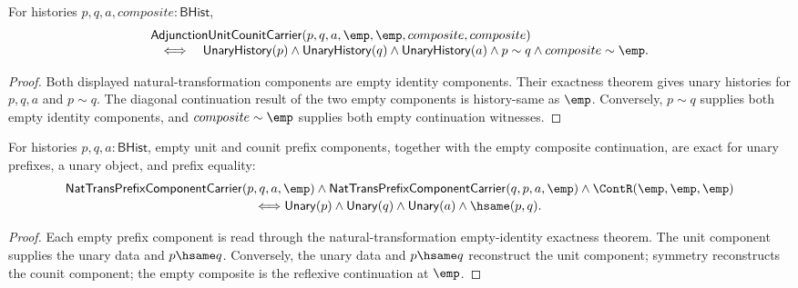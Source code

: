 \begin{theorem}
\label{thm:adjunction-unit-counit-empty-components-exact}
For histories $p,q,a,composite:\mathsf{BHist}$,
$$
\begin{array}{l}
\mathsf{AdjunctionUnitCounitCarrier}(p,q,a,\emp,\emp,composite,composite)\\
\quad\Longleftrightarrow\quad
\mathsf{UnaryHistory}(p)\land
\mathsf{UnaryHistory}(q)\land
\mathsf{UnaryHistory}(a)\land
p\sim q\land composite\sim\emp.
\end{array}
$$
\end{theorem}
\begin{proof}
Both displayed natural-transformation components are empty identity components.
Their exactness theorem gives unary histories for $p,q,a$ and $p\sim q$. The
diagonal continuation result of the two empty components is history-same as
$\emp$. Conversely, $p\sim q$ supplies both empty identity components, and
$composite\sim\emp$ supplies both empty continuation witnesses.
\end{proof}

\begin{theorem}
\label{thm:adjunction-empty-unit-counit-prefix}
For histories $p,q,a:\mathsf{BHist}$, empty unit and counit prefix components,
together with the empty composite continuation, are exact for unary prefixes,
a unary object, and prefix equality:
$$
\begin{array}{c}
\mathsf{NatTransPrefixComponentCarrier}(p,q,a,\emp)
\land
\mathsf{NatTransPrefixComponentCarrier}(q,p,a,\emp)
\land
\ContR(\emp,\emp,\emp)
\\[2pt]
\Longleftrightarrow
\mathsf{Unary}(p)\land\mathsf{Unary}(q)\land\mathsf{Unary}(a)\land\hsame(p,q).
\end{array}
$$
\end{theorem}
\begin{proof}
Each empty prefix component is read through the natural-transformation
empty-identity exactness theorem. The unit component supplies the unary data and
$p\hsame q$. Conversely, the unary data and $p\hsame q$ reconstruct the unit
component; symmetry reconstructs the counit component; the empty composite is
the reflexive continuation at $\emp$.
\end{proof}

